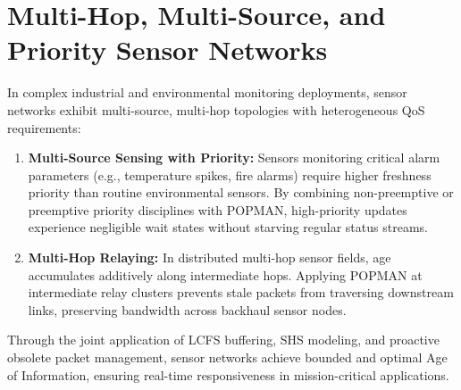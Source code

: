 \section{Multi-Hop, Multi-Source, and Priority Sensor Networks}
\label{sec:multihop_multisource_priority}

In complex industrial and environmental monitoring deployments, sensor networks exhibit multi-source, multi-hop topologies with heterogeneous QoS requirements:
\begin{enumerate}
    \item \textbf{Multi-Source Sensing with Priority:} Sensors monitoring critical alarm parameters (e.g., temperature spikes, fire alarms) require higher freshness priority than routine environmental sensors. By combining non-preemptive or preemptive priority disciplines with POPMAN, high-priority updates experience negligible wait states without starving regular status streams.
    \item \textbf{Multi-Hop Relaying:} In distributed multi-hop sensor fields, age accumulates additively along intermediate hops. Applying POPMAN at intermediate relay clusters prevents stale packets from traversing downstream links, preserving bandwidth across backhaul sensor nodes.
\end{enumerate}
Through the joint application of LCFS buffering, SHS modeling, and proactive obsolete packet management, sensor networks achieve bounded and optimal Age of Information, ensuring real-time responsiveness in mission-critical applications.
